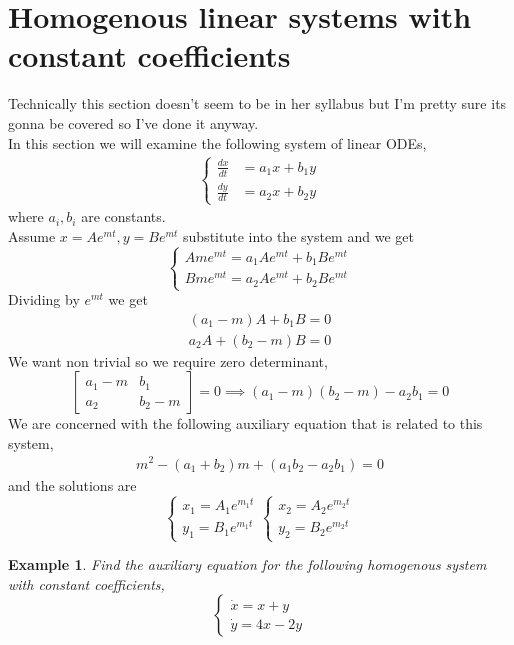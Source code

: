\documentclass[oneside,11pt,pdftex,final]{book}%
\numberwithin{equation}{section}
\newtheorem{example}[theorem]{Example}
\numberwithin{section}{chapter}
\numberwithin{equation}{chapter}
\begin{document}
\section{Homogenous linear systems with constant coefficients}
Technically this section doesn't seem to be in her syllabus but I'm pretty sure its gonna be covered so I've done it anyway.\\
In this section we will examine the following system of linear ODEs,
\begin{align}\label{def:constanthomo}
	\begin{cases}
		\frac{dx}{dt}&=a_1x+b_1y\\
		\frac{dy}{dt}&=a_2x+b_2y
	\end{cases}
\end{align}
where $ a_i,b_i $ are constants.\\
Assume $ x=Ae^{mt},y=Be^{mt} $ substitute into the system and we get 
\[ \begin{cases}
	Ame^{mt}=a_1Ae^{mt}+b_1Be^{mt}\\
	Bme^{mt}=a_2Ae^{mt}+b_2Be^{mt}
\end{cases} \]
Dividing by $ e^{mt} $ we get 
\begin{align*}
	(a_1-m)A+b_1B=0\\
	a_2A+(b_2-m)B=0
\end{align*}
We want non trivial so we require zero determinant,
\[ \begin{bmatrix}
	a_1-m & b_1\\
	a_2 & b_2-m
\end{bmatrix} =0 \implies (a_1-m)(b_2-m)-a_2b_1=0\] 
We are concerned with the following auxiliary equation that is related to this system,
\begin{align}\label{def:sysaux}
	m^2-(a_1+b_2)m+(a_1b_2-a_2b_1)=0
\end{align}
and the solutions are 
\[ \begin{cases}
	x_1=A_1e^{m_1t}\\
	y_1=B_1e^{m_1t}
\end{cases} \begin{cases}
x_2=A_2e^{m_2t}\\
y_2=B_2e^{m_2t}
\end{cases}
\]
\begin{example}
	Find the auxiliary equation for the following homogenous system with constant coefficients,
	\[ \begin{cases}
		\dot{x}=x+y\\
		\dot{y}=4x-2y
	\end{cases} \]
\end{example}
\end{document}
